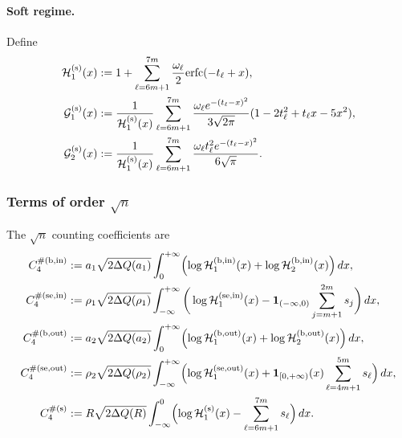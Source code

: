 \documentclass[a4paper]{article}
\newcommand{\erfc}{{\rm erfc}}
\numberwithin{equation}{section}
\begin{document}
\paragraph{Soft regime.}
Define
\begin{align}
\mathcal{H}_1^{(\mathrm{s})}(x)
&:= 
1+\sum_{\ell=6m+1}^{7m}
\frac{\omega_{\ell}}{2}\erfc(-t_{\ell}+x),
\\
\mathcal{G}_1^{(\mathrm{s})}(x)
&:=
\frac{1}{\mathcal{H}_1^{(\mathrm{s})}(x)}
\sum_{\ell=6m+1}^{7m}
\frac{\omega_{\ell}e^{-(t_{\ell}-x)^2}}{3\sqrt{2\pi}}
(1-2t_{\ell}^2+t_{\ell}x-5x^2), 
\\
\mathcal{G}_2^{(\mathrm{s})}(x)
&:=
\frac{1}{\mathcal{H}_1^{(\mathrm{s})}(x)}
\sum_{\ell=6m+1}^{7m}
\frac{\omega_{\ell}t_{\ell}^2e^{-(t_{\ell}-x)^2}}{6\sqrt{\pi}}.
\end{align}






\subsubsection{Terms of order \texorpdfstring{$\sqrt n$}{sqrt(n)}}
The $\sqrt n$ counting coefficients are
\begin{align}
C_4^{\#(\mathrm{b,in})}&:=
a_1\sqrt{2\Delta Q(a_1)}
\int_0^{+\infty}
\Bigl(
\log\mathcal{H}_1^{(\mathrm{b,in})}(x)
+
\log\mathcal{H}_2^{(\mathrm{b,in})}(x)
\Bigr)
\,dx,
\\
C_4^{\#(\mathrm{se,in})}
&:= 
\rho_1\sqrt{2\Delta Q(\rho_1)}\int_{-\infty}^{+\infty}
\bigg(
\log\mathcal{H}_1^{(\mathrm{se,in})}(x)
-
\mathbf{1}_{(-\infty,0)}
\sum_{j=m+1}^{2m}s_{j}
\bigg)
\,dx,
\\
C_4^{\#(\mathrm{b,out})}
&:= 
a_2\sqrt{2\Delta Q(a_2)}
\int_0^{+\infty}
\Bigl(
\log\mathcal{H}_{1}^{(\mathrm{b,out})}(x)
+
\log\mathcal{H}_{2}^{(\mathrm{b,out})}(x)
\Bigr)
\,dx, 
\\
C_4^{\#(\mathrm{se,out})}
&:= 
\rho_2\sqrt{2\Delta Q(\rho_2)}
\int_{-\infty}^{+\infty}
\Bigl( \log \mathcal{H}_{1}^{(\mathrm{se,out})}
(x)
+\mathbf{1}_{[0,+\infty)}(x)\sum_{\ell=4m+1}^{5m}s_{\ell}\Bigr)\,dx,
\\
C_4^{\#(\mathrm{s})}
&:= 
R\sqrt{2\Delta Q(R)}\int_{-\infty}^{0}
\Bigl( \log\mathcal{H}_{1}^{(\mathrm{s})}(x) -\sum_{\ell=6m+1}^{7m}s_{\ell} \Bigr)\,dx.
\end{align}
\end{document}
